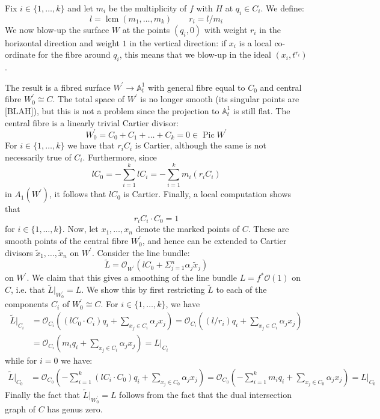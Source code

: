 \documentclass[11pt]{amsart}
\newcommand{\OO}{\mathcal{O}}
\renewcommand{\to}{\rightarrow}
\newcommand{\Aaff}{\mathbb{A}}
\newcommand{\Pic}{\operatorname{Pic}}
\theoremstyle{definition}
\theoremstyle{definition}
\begin{document}
Fix $i \in \{1,\ldots,k\}$ and let $m_i$ be the multiplicity of $f$ with $H$ at $q_i \in C_i$. We define:
\begin{equation*} l = \operatorname{lcm}(m_1,\ldots,m_k) \qquad r_i = l/m_i \end{equation*}
We now blow-up the surface $W$ at the points $(q_i,0)$ with weight $r_i$ in the horizontal direction and weight $1$ in the vertical direction: if $x_i$ is a local co-ordinate for the fibre around $q_i$, this means that we blow-up in the ideal $(x_i,t^{r_i})$.

The result is a fibred surface $W^\prime \to \Aaff^1_t$ with general fibre equal to $C_0$ and central fibre $W^\prime_0 \cong C$. The total space of $W^\prime$ is no longer smooth (its singular points are [BLAH]), but this is not a problem since the projection to $\Aaff^1_t$ is still flat. The central fibre is a linearly trivial Cartier divisor:
\begin{equation*} W^\prime_0 = C_0 + C_1 + \ldots + C_k = 0 \in \Pic W^\prime \end{equation*}
For $i \in \{1,\ldots,k\}$ we have that $r_i C_i$ is Cartier, although the same is not necessarily true of $C_i$. Furthermore, since
\begin{equation*} l C_0 = - \sum_{i=1}^k l C_i = - \sum_{i=1}^k m_i (r_i C_i) \end{equation*}
in $A_1(W^\prime)$, it follows that $lC_0$ is Cartier. Finally, a local computation shows that
\begin{equation*} r_i C_i \cdot C_0 = 1 \end{equation*}
for $i \in \{1,\ldots,k\}$. Now, let $x_1,\ldots,x_n$ denote the marked points of $C$. These are smooth points of the central fibre $W^\prime_0$, and hence can be extended to Cartier divisors $\tilde{x}_1,\ldots,\tilde{x}_n$ on $W^\prime$. Consider the line bundle:
\begin{equation*} \tilde{L} = \OO_{W^\prime}(l C_0 + \Sigma_{j=1}^n \alpha_j \tilde{x}_j) \end{equation*}
on $W^\prime$. We claim that this gives a smoothing of the line bundle $L=f^*\OO(1)$ on $C$, i.e. that $\tilde{L}|_{W^\prime_0} = L$. We show this by first restricting $\tilde{L}$ to each of the components $C_i$ of $W^\prime_0 \cong C$. For $i \in \{1,\ldots,k\}$, we have
\begin{align*} \tilde{L}|_{C_i} & = \OO_{C_i} \left( (l C_0 \cdot C_i) q_i + \sum_{x_j \in C_i} \alpha_j x_j \right) = \OO_{C_i} \left( (l/r_i) q_i + \sum_{x_j \in C_i} \alpha_j x_j \right)\\
& = \OO_{C_i} \left( m_i q_i + \sum_{x_j \in C_i} \alpha_j x_j \right) = L|_{C_i} \end{align*}
while for $i=0$ we have:
\begin{align*} \tilde{L}|_{C_0} & = \OO_{C_0} \left( - \sum_{i=1}^k (l C_i \cdot C_0) q_i + \sum_{x_j \in C_0} \alpha_j x_j \right) = \OO_{C_0} \left( - \sum_{i=1}^k m_i q_i + \sum_{x_j \in C_0} \alpha_j x_j \right)  = L|_{C_0} \end{align*}
Finally the fact that $\tilde{L}|_{W^\prime_0} = L$ follows from the fact that the dual intersection graph of $C$ has genus zero.
\end{document}
